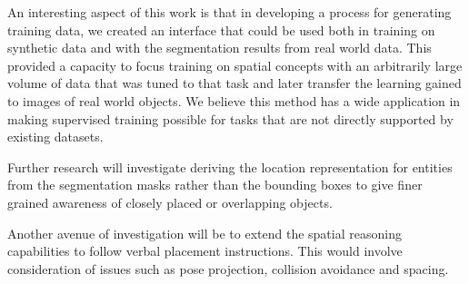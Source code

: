 \documentclass[conference]{IEEEtran}
\begin{document}
An interesting aspect of this work is that in developing a process for generating training data, we created an interface that could be used both in training on synthetic data and with the segmentation results from real world data.  This provided a capacity to focus training on spatial concepts with an arbitrarily large volume of data that was tuned to that task and later transfer the learning gained to images of real world objects.  We believe this method has a wide application in making supervised training possible for tasks that are not directly supported by existing datasets.

Further research will investigate deriving the location representation for entities from the segmentation masks rather than the bounding boxes to give finer grained awareness of closely placed or overlapping objects. 

Another avenue of investigation will be to extend the spatial reasoning capabilities to follow verbal placement instructions. This would involve consideration of issues such as pose projection, collision avoidance and spacing.


    \printbibliography

    \vspace{12pt}
    
    
\end{document}
